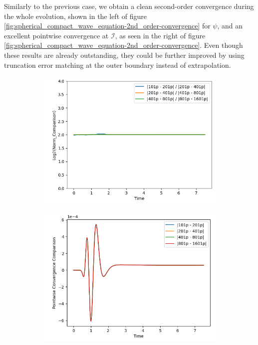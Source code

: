 Similarly to the previous case, we obtain a clean second-order convergence during the whole evolution, shown in the left of figure \ref{fig:spherical_compact_wave_equation-2nd_order-convergence} for $\psi$, and an excellent pointwise convergence at $\mathscr{I}$, as seen in the right of figure \ref{fig:spherical_compact_wave_equation-2nd_order-convergence}. Even though these results are already outstanding, they could be further improved by using truncation error matching at the outer boundary instead of extrapolation.

\begin{figure}[h]
    \centering
    \begin{subfigure}[b]{0.45\textwidth}
        \centering
        \includegraphics[width=\textwidth]{Images/Wave_Equation_3+1_Spherical-Norm.png}
    \end{subfigure}
    \hfill
    \begin{subfigure}[b]{0.45\textwidth}
        \centering
        \includegraphics[width=\textwidth]{Images/Wave_Equation_3+1_Spherical-Pointwise.png}

\end{subfigure}
\end{figure}
